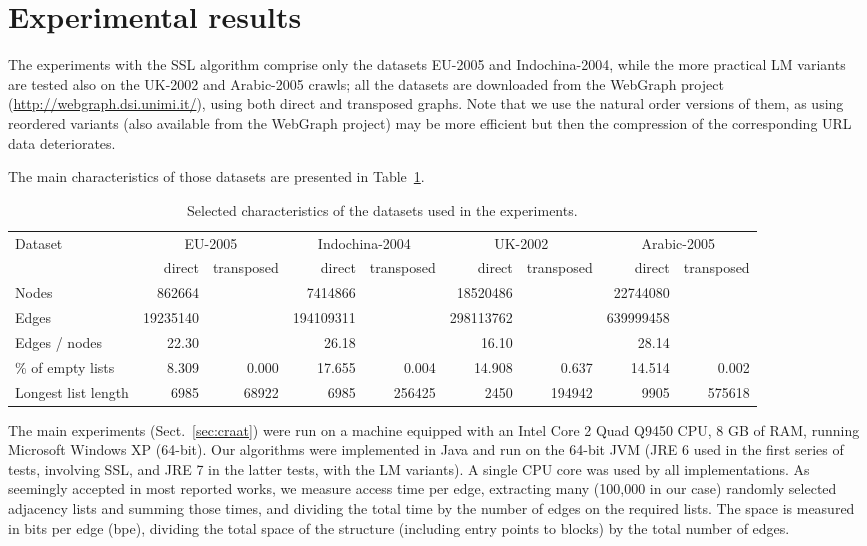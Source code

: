 \documentclass[envcountsame]{llncs}
\begin{document}
\section{Experimental results}


The experiments with the SSL algorithm comprise only the datasets 
EU-2005 and Indochina-2004, while the more practical LM variants 
are tested also on the UK-2002 and Arabic-2005 crawls; 
all the datasets are 
downloaded from the WebGraph project (\url{http://webgraph.dsi.unimi.it/}),
using both direct and transposed graphs.
Note that we use the natural order versions of them, as 
using reordered variants (also available from the WebGraph project) 
may be more efficient but then the compression of the corresponding URL data 
deteriorates.

The main characteristics of those datasets are presented in Table~\ref{table:datasets}.


\begin{table}
\centering
\begin{tabular}{lrrrrrrrr}
\hline
Dataset & \multicolumn{2}{c}{EU-2005} &  \multicolumn{2}{c}{Indochina-2004} & \multicolumn{2}{c}{UK-2002} &  \multicolumn{2}{c}{Arabic-2005} \\
\cline{2-9}
        &  direct & transposed & direct & transposed  
        &  direct & transposed & direct & transposed \\
\hline
Nodes & 862664   & & 7414866   & & 18520486  & & 22744080  & \\
Edges & 19235140 & & 194109311 & & 298113762 & & 639999458 & \\
Edges / nodes & 22.30 & & 26.18 & & 16.10 & & 28.14 & \\
\% of empty lists & 8.309 & 0.000 & 17.655 & 0.004 & 14.908 & 0.637 & 14.514 &  0.002 \\
Longest list length & 6985 & 68922 & 6985 & 256425 & 2450 & 194942 & 9905 & 575618 \\
\hline
\end{tabular}
\vspace{4mm}
\caption{Selected characteristics of the datasets used in the experiments.}
\label{table:datasets}
\end{table}

The main experiments (Sect.~\ref{sec:craat})
were run on a machine equipped with an Intel Core 2 Quad Q9450 CPU, 
8 GB of RAM, running Microsoft Windows XP (64-bit).
Our algorithms were implemented in Java and run on the 64-bit JVM 
(JRE 6 used in the first series of tests, involving SSL, 
and JRE 7 in the latter tests, with the LM variants). 
A single CPU core was used by all implementations.
As seemingly accepted in most reported works, 
we measure access time per edge, extracting many (100,000 in our case) 
randomly selected adjacency lists and summing those times, and dividing the 
total time by the number of edges on the required lists.
The space is measured in bits per edge (bpe), dividing the
total space of the structure (including entry points to blocks)
by the total number of edges.
\end{document}
